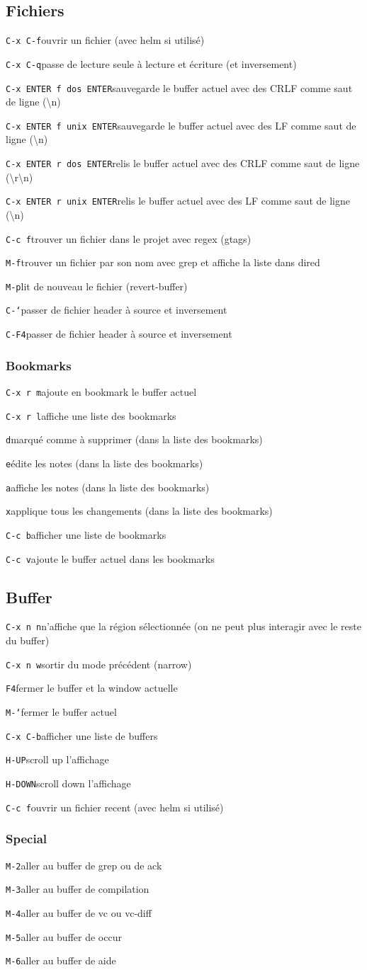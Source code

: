 \documentclass[10pt,landscape]{article}
\def\cm#1#2{{\tt#1}\dotfill#2\par}
\begin{document}
\begin{multicols}{3}
\subsection{Fichiers}
\cm{C-x C-f}{ouvrir un fichier (avec helm si utilisé)}
\cm{C-x C-q}{passe de lecture seule à lecture et écriture (et inversement)}
\cm{C-x ENTER f dos ENTER}{sauvegarde le buffer actuel avec des CRLF comme saut de ligne (\textbackslash n)}
\cm{C-x ENTER f unix ENTER}{sauvegarde le buffer actuel avec des LF comme saut de ligne (\textbackslash n)}
\cm{C-x ENTER r dos ENTER}{relis le buffer actuel avec des CRLF comme saut de ligne (\textbackslash r\textbackslash n)}
\cm{C-x ENTER r unix ENTER}{relis le buffer actuel avec des LF comme saut de ligne (\textbackslash n)}
\cm{C-c f}{trouver un fichier dans le projet avec regex (gtags)}
\cm{M-f}{trouver un fichier par son nom avec grep et affiche la liste dans dired}
\cm{M-p}{lit de nouveau le fichier (revert-buffer)}
\cm{C-`}{passer de fichier header à source et inversement}
\cm{C-F4}{passer de fichier header à source et inversement}

\subsubsection{Bookmarks}
\cm{C-x r m}{ajoute en bookmark le buffer actuel}
\cm{C-x r l}{affiche une liste des bookmarks}
\cm{d}{marqué comme à supprimer (dans la liste des bookmarks)}
\cm{e}{édite les notes (dans la liste des bookmarks)}
\cm{a}{affiche les notes (dans la liste des bookmarks)}
\cm{x}{applique tous les changements (dans la liste des bookmarks)}
\cm{C-c b}{afficher une liste de bookmarks}
\cm{C-c v}{ajoute le buffer actuel dans les bookmarks}



\subsection{Buffer}
\cm{C-x n n}{n'affiche que la région sélectionnée (on ne peut plus interagir avec le reste du buffer)}
\cm{C-x n w}{sortir du mode précédent (narrow)}
\cm{F4}{fermer le buffer et la window actuelle}
\cm{M-`}{fermer le buffer actuel}
\cm{C-x C-b}{afficher une liste de buffers}
\cm{H-UP}{scroll up l'affichage}
\cm{H-DOWN}{scroll down l'affichage}
\cm{C-c f}{ouvrir un fichier recent (avec helm si utilisé)}

\subsubsection{Special}
\cm{M-2}{aller au buffer de grep ou de ack}
\cm{M-3}{aller au buffer de compilation}
\cm{M-4}{aller au buffer de vc ou vc-diff}
\cm{M-5}{aller au buffer de occur}
\cm{M-6}{aller au buffer de aide}






\end{multicols}
\end{document}
